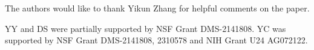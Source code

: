 \documentclass[aos, preprint]{imsart}
\theoremstyle{plain}
\theoremstyle{definition}
\begin{document}
\begin{itemize}





\end{itemize}


\begin{acks}[Acknowledgments]
The authors would like to thank Yikun Zhang for helpful comments on the paper.
\end{acks}
%
\begin{funding}
YY and DS were partially supported by NSF Grant DMS-2141808.
YC was supported by NSF Grant DMS-2141808, 2310578 and NIH Grant U24 AG072122. 

\end{funding}
%
%
\end{document}
